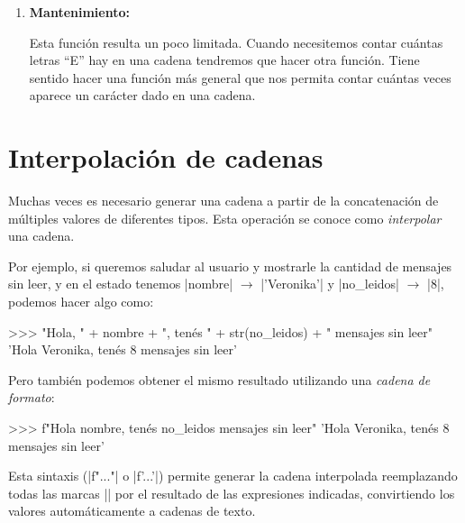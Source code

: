 \begin{enumerate}
\item {\bf Mantenimiento:}

Esta función resulta un poco limitada. Cuando necesitemos contar
cuántas letras \enquote{E} hay en una cadena tendremos que hacer otra función.
Tiene sentido hacer una función más general que nos permita contar cuántas
veces aparece un carácter dado en una cadena.




\end{enumerate}

\section{Interpolación de cadenas}

Muchas veces es necesario generar una cadena a partir de la concatenación de
múltiples valores de diferentes tipos. Esta operación se conoce como
\emph{interpolar} una cadena.

Por ejemplo, si queremos saludar al usuario y mostrarle la
cantidad de mensajes sin leer, y en el estado tenemos |nombre| $\rightarrow$ |'Veronika'| y
|no_leidos| $\rightarrow$ |8|, podemos hacer algo como:

\begin{codigo-python-sn}
>>> "Hola, " + nombre + ", tenés " + str(no_leidos) + " mensajes sin leer"
'Hola Veronika, tenés 8 mensajes sin leer'
\end{codigo-python-sn}

Pero también podemos obtener el mismo resultado utilizando una \emph{cadena de
formato}:

\begin{codigo-python-sn}
>>> f"Hola {nombre}, tenés {no_leidos} mensajes sin leer"
'Hola Veronika, tenés 8 mensajes sin leer'
\end{codigo-python-sn}

Esta sintaxis (|f"..."| o |f'...'|) permite generar la cadena interpolada reemplazando
todas las marcas |{}| por el resultado de las expresiones
indicadas, convirtiendo los valores automáticamente a cadenas de texto.

